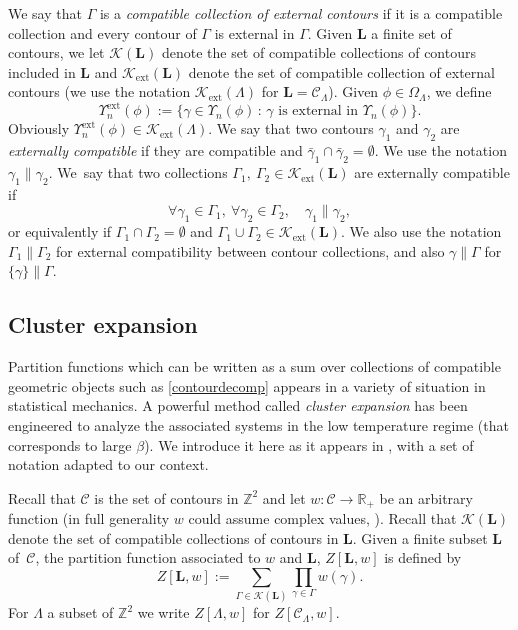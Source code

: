 \documentclass[JEP,XML,SOM,Unicode, NoFloatCountersInSection]{cedram}
\let\mathcal\mathscr
\newcommand{\sep}{\,:\,}
\numberwithin{equation}{section}
\theoremstyle{plain}
\theoremstyle{definition}
\newcommand{\ext}{\mathrm{ext}}
\newcommand{\cC}{{\ensuremath{\mathcal C}} }
\newcommand{\cK}{{\ensuremath{\mathcal K}} }
\newcommand{\bL}{{\ensuremath{\mathbf L}} }
\newcommand{\bbR}{{\ensuremath{\mathbb R}} }
\newcommand{\bbZ}{{\ensuremath{\mathbb Z}} }
\newcommand{\gb}{\beta}
\newcommand{\gG}{\Gamma}
\newcommand{\gO}{\Omega}
\newcommand{\gL}{\Lambda}
\begin{document}
We say that $\gG$ is a \textit{compatible collection of external contours} if it is a compatible collection and every contour of $\gG$ is external in $\gG$.
Given $\bL$ a finite set of contours, we let $\cK(\bL)$ denote the set of compatible collections of contours included in $\bL$ and
$\cK_{\ext}(\bL)$ denote the set of compatible collection of external contours
(we use the notation $\cK_{\ext}(\gL)$ for $\bL=\cC_{\gL}$).
Given $\phi\in \gO_{\gL}$, we define
\begin{equation*}%
\Upsilon^{\ext}_n(\phi):=\{ \gamma \in \Upsilon_n(\phi) \sep \gamma \text{ is external in } \Upsilon_n(\phi) \}.
\end{equation*}
Obviously $ \Upsilon^{\ext}_n(\phi)\in \cK_{\ext}(\gL)$.
We say that two contours $\gamma_1$ and $\gamma_2$ are \textit{externally compatible} if they are compatible and
$\bar \gamma_1\cap \bar \gamma_2=\emptyset$. We use the notation $\gamma_1\parallel \gamma_2$.
We~say that two collections
$\gG_1,\ \gG_2 \in \cK_{\ext}(\bL)$ are externally compatible if
\begin{equation*}%
\forall \gamma_1\in \gG_1, \ \forall \gamma_2\in \gG_2, \quad \gamma_1 \parallel \gamma_2,
\end{equation*}
or equivalently if $\gG_1\cap \gG_2=\emptyset$ and
$\gG_1\cup \gG_2\in \cK_{\ext}(\bL)$.
We also use the notation $\gG_1 \parallel \gG_2$ for external compatibility between contour collections, and also $\gamma \parallel \gG$ for $\{ \gamma \} \parallel \gG$.

\subsection{Cluster expansion}\label{clusexp}

Partition functions which can be written as a sum over collections of compatible geometric objects such as \eqref{contourdecomp}
appears in a variety of situation in statistical mechanics. A powerful method called \textit{cluster expansion} has been engineered to analyze the associated systems in the
low temperature regime (that corresponds to large $\gb$).
We introduce it here as it appears in \cite{cf:KP}, with a set of notation adapted to our context.

Recall that $\cC$ is the set of contours in $\bbZ^2$ and let $w: \cC \to \bbR_+$ be an arbitrary function (in full generality $w$ could assume complex values, \cf \cite{cf:KP}).
Recall that $\cK(\bL)$ denote the set of compatible collections of contours in $\bL$.
Given a finite subset ${\bL}$ of~$\cC$, the partition function associated to $w$ and $\bL$, $Z[\bL,w]$ is defined
by
\begin{equation}\label{weightpar}
Z[\bL,w]:= \sum_{\gG\in \cK(\bL)} \prod_{\gamma \in \gG} w(\gamma).
\end{equation}
For $\gL$ a subset of $\bbZ^2$ we write $Z[\gL,w]$ for $Z[\cC_{\gL},w]$.
\end{document}
